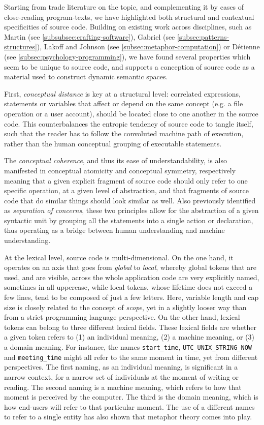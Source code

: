 Starting from trade literature on the topic, and complementing it by cases of close-reading program-texts, we have highlighted both structural and contextual specificities of source code. Building on existing work across disciplines, such as Martin (see \ref{subsubsec:crafting-software}), Gabriel (see \ref{subsec:patterns-structures}), Lakoff and Johnson (see \ref{subsec:metaphor-computation}) or Détienne (see \ref{subsec:psychology-programming}), we have found several properties which seem to be unique to source code, and supports a conception of source code as a material used to construct dynamic semantic spaces.

First, \emph{conceptual distance} is key at a structural level: correlated expressions, statements or variables that affect or depend on the same concept (e.g. a file operation or a user account), should be located close to one another in the source code. This counterbalances the entropic tendency of source code to tangle itself, such that the reader has to follow the convoluted machine path of execution, rather than the human conceptual grouping of executable statements.

The \emph{conceptual coherence}, and thus its ease of understandability, is also manifested in conceptual atomicity and conceptual symmetry, respectively meaning that a given explicit fragment of source code should only refer to one specific operation, at a given level of abstraction, and that fragments of source code that do similar things should look similar as well. Also previously identified as \emph{separation of concerns}, these two principles allow for the abstraction of a given syntactic unit by grouping all the statements into a single action or declaration, thus operating as a bridge between human understanding and machine understanding.

At the lexical level, source code is multi-dimensional. On the one hand, it operates on an axis that goes from \emph{global} to \emph{local}, whereby global tokens that are used, and are visible, across the whole application code are very explicitly named, sometimes in all uppercase, while local tokens, whose lifetime does not exceed a few lines, tend to be composed of just a few letters. Here, variable length and cap size is closely related to the concept of \emph{scope}, yet in a slightly looser way than from a strict programming language perspective. On the other hand, lexical tokens can belong to three different lexical fields. These lexical fields are whether a given token refers to (1) an individual meaning, (2) a machine meaning, or (3) a domain meaning. For instance, the names \lstinline{start_time}, \lstinline{UTC_UNIX_STRING_NOW} and \lstinline{meeting_time} might all refer to the same moment in time, yet from different perspectives. The first naming, as an individual meaning, is significant in a narrow context, for a narrow set of individuals at the moment of writing or reading. The second naming is a machine meaning, which refers to how that moment is perceived by the computer. The third is the domain meaning, which is how end-users will refer to that particular moment. The use of a different names to refer to a single entity has also shown that metaphor theory comes into play.

